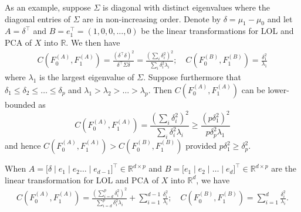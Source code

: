 \documentclass[10pt]{article}
\begin{document}
As an example, suppose $\Sigma$ is diagonal with distinct eigenvalues where the diagonal entries of $\Sigma$ are in non-increasing order. 
Denote by $\delta = \mu_1 - \mu_0$ and let
$A = \delta^{\top}$ and $B = e_1^{\top} = (1,0,0,\dots,0)$ be the linear transformations for LOL and PCA of $X$ into $\mathbb{R}$. We then have  
\begin{gather*}
C(F_0^{(A)}, F_1^{(A)}) = \frac{(\delta^{\top} \delta)^2}{\delta^{\top} \Sigma \delta} = \frac{(\sum_{i} \delta_i^{2})^{2}}{\sum_{i} \delta_i^{2} \lambda_i}; \quad 
C(F_0^{(B)}, F_1^{(B)}) = \frac{\delta_1^2}{\lambda_1}
\end{gather*}
where $\lambda_1$ is the largest eigenvalue of $\Sigma$. Suppose furthermore that $\delta_1 \leq \delta_2 \leq \dots \leq \delta_p$ and $\lambda_1 > \lambda_2 > \dots > \lambda_p$. Then $C(F_0^{(A)}, F_1^{(A)})$ can be lower-bounded as
$$ C(F_0^{(A)}, F_1^{(A)}) = \frac{(\sum_{i} \delta_i^{2})^{2}}{\sum_{i} \delta_i^{2} \lambda_i} \geq \frac{(p \delta_1^2)^2}{p \delta_p^{2} \lambda_1} $$
and hence $C(F_0^{(A)}, F_1^{(A)}) > C(F_0^{(B)}, F_1^{(B)})$ provided $p \delta_1^{2}  \geq \delta_p^2$. 

When $A = \bigl[ \delta \mid e_1 \mid e_2 \dots \mid e_{d-1} \bigr]^{\top} \in \mathbb{R}^{d \times p}$ and $B = \bigl[e_1 \mid e_2 \mid \dots \mid e_d \bigr]^{\top} \in \mathbb{R}^{d \times p}$ are the linear transformation for LOL and PCA of $X$ into $\mathbb{R}^{d}$, we have
\begin{gather*}
C(F_0^{(A)}, F_1^{(A)}) = \frac{(\sum_{i=d}^{p} \delta_i^2)^2}{\sum_{i=d}^{p} \delta_i^2 \lambda_i} + \sum_{i=1}^{d-1} \frac{\delta_i^{2}}{\lambda_i};  \quad 
C(F_0^{(B)}, F_1^{(B)}) = \sum_{i=1}^{d} \frac{\delta_i^2}{\lambda_i}.
\end{gather*}
\end{document}
